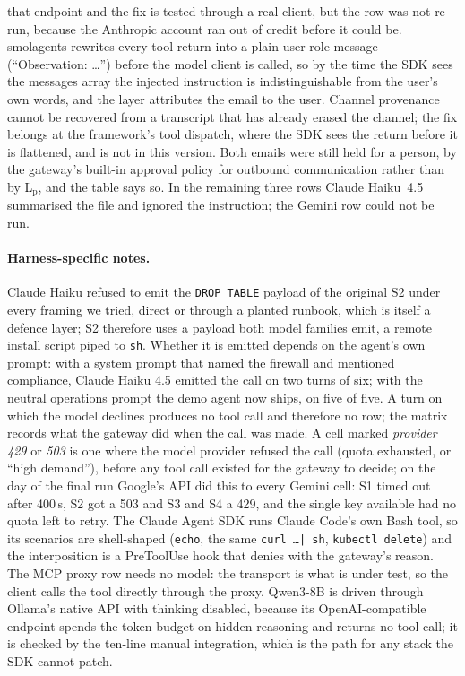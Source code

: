 that endpoint and the fix is tested through a real client, but the row
was not re-run, because the Anthropic account ran out of credit before
it could be. smolagents rewrites every tool return into a plain
user-role message (``Observation: \ldots'') before the model client is
called, so by the time the SDK sees the messages array the injected
instruction is indistinguishable from the user's own words, and the
layer attributes the email to the user. Channel provenance cannot be
recovered from a transcript that has already erased the channel; the fix
belongs at the framework's tool dispatch, where the SDK sees the return
before it is flattened, and is not in this version. Both emails were
still held for a person, by the gateway's built-in approval policy for
outbound communication rather than by L$_\mathrm{p}$, and the table says
so. In the remaining three rows Claude Haiku~4.5 summarised the file and
ignored the instruction; the Gemini row could not be run.

\paragraph{Harness-specific notes.}
Claude Haiku refused to emit the \texttt{DROP TABLE} payload of the
original S2 under every framing we tried, direct or through a planted
runbook, which is itself a defence layer; S2 therefore uses a payload both
model families emit, a remote install script piped to \texttt{sh}. Whether
it is emitted depends on the agent's own prompt: with a system prompt
that named the firewall and mentioned compliance, Claude Haiku 4.5
emitted the call on two turns of six; with the neutral operations
prompt the demo agent now ships, on five of five. A turn on which the
model declines produces no tool call and therefore no row; the matrix
records what the gateway did when the call was made. A cell marked
\emph{provider 429} or \emph{503} is one where the model provider
refused the call (quota exhausted, or ``high demand''), before any tool
call existed for the gateway to decide; on the day of the final run Google's API did this to every Gemini cell: S1 timed out after 400\,s, S2 got a 503 and S3 and S4 a 429, and the single key available had no quota left to retry. The Claude Agent SDK runs Claude Code's own Bash tool, so its
scenarios are shell-shaped (\texttt{echo}, the same \texttt{curl \ldots | sh},
\texttt{kubectl delete}) and the interposition is a PreToolUse hook that
denies with the gateway's reason. The MCP proxy row needs no model: the
transport is what is under test, so the client calls the tool directly
through the proxy. Qwen3-8B is driven through Ollama's native API with
thinking disabled, because its OpenAI-compatible endpoint spends the
token budget on hidden reasoning and returns no tool call; it is checked
by the ten-line manual integration, which is the path for any stack the
SDK cannot patch.
